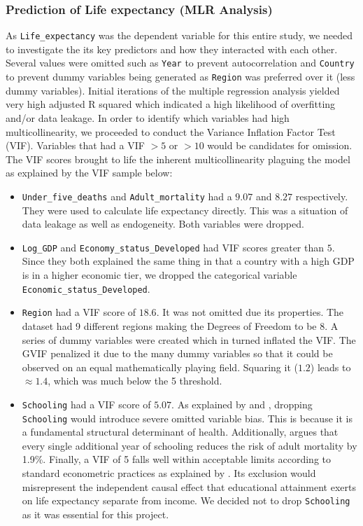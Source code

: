 \documentclass[3pt, a4paper]{article}
\begin{document}
\subsubsection{Prediction of Life expectancy (MLR Analysis)}
As \texttt{Life\_expectancy} was the dependent variable for this entire study, we needed to investigate the its key predictors and how they interacted with each other. Several values were omitted such as \texttt{Year} to prevent autocorrelation and \texttt{Country} to prevent dummy variables being generated as \texttt{Region} was preferred over it (less dummy variables). Initial iterations of the multiple regression analysis yielded very high adjusted R squared which indicated a high likelihood of overfitting and/or data leakage. In order to identify which variables had high multicollinearity, we proceeded to conduct the Variance Inflation Factor Test (VIF). Variables that had a VIF $>5$ or $>10$ would be candidates for omission. The VIF scores brought to life the inherent multicollinearity plaguing the model as explained by the VIF sample below:
\begin{itemize}[noitemsep,topsep=0pt]
    \item \texttt{Under\_five\_deaths} and \texttt{Adult\_mortality} had a $9.07$ and $8.27$ respectively. They were used to calculate life expectancy directly. This was a situation of data leakage as well as endogeneity. Both variables were dropped.
    \item \texttt{Log\_GDP} and \texttt{Economy\_status\_Developed} had VIF scores greater than $5$. Since they both explained the same thing in that a country with a high GDP is in a higher economic tier, we dropped the categorical variable \texttt{Economic\_status\_Developed}. 
    \item \texttt{Region} had a VIF score of $18.6$. It was not omitted due its properties. The dataset had 9 different regions making the Degrees of Freedom to be 8. A series of dummy variables were created which in turned inflated the VIF. The GVIF penalized it due to the many dummy variables so that it could be observed on an equal mathematically playing field. Squaring it ($1.2$) leads to $\approx 1.4$, which was much below the 5 threshold.
    \item \texttt{Schooling} had a VIF score of $5.07$. As explained by \citet{grossman1972} and \citet{llerasmuney2005}, dropping \texttt{Schooling} would introduce severe omitted variable bias. This is because it is a fundamental structural determinant of health. Additionally, \citet{balaj2024} argues that every single additional year of schooling reduces the risk of adult mortality by 1.9\%. Finally, a VIF of 5 falls well within acceptable limits according to standard econometric practices as explained by \citet{obrien2007}. Its exclusion would misrepresent the independent causal effect that educational attainment exerts on life expectancy separate from income. We decided not to drop \texttt{Schooling} as it was essential for this project.
\end{itemize}
\end{document}
